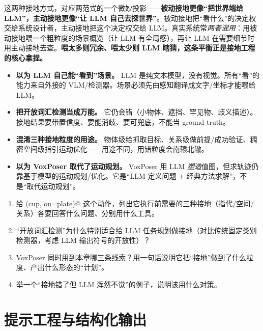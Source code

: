 \begin{insight}
这两种接地方式，对应两范式的一个微妙投影——\textbf{被动接地更像“把世界端给 LLM”，主动接地更像“让 LLM 自己去探世界”}。被动接地把“看什么”的决定权交给系统设计者，主动接地把这个决定权交给 LLM。真实系统常\emph{两者混用}：用被动接地喂一个粗粒度的场景概览（让 LLM 有全局感），再让 LLM 在需要细节时用主动接地去查。\textbf{喂太多则冗余、喂太少则 LLM 瞎猜，这条平衡正是接地工程的核心拿捏。}
\end{insight}

\begin{pitfall}[本节常见陷阱]
\begin{itemize}
  \item \textbf{以为 LLM 自己能“看到”场景。} LLM 是纯文本模型，没有视觉。所有“看”的能力来自外接的 VLM/检测器。场景必须先由感知翻译成文字/坐标才能喂给 LLM。
  \item \textbf{把开放词汇检测当成万能。} 它仍会错（小物体、遮挡、罕见物、歧义描述）。接地结果要带置信度、要能消歧、要可兜底，不能当 ground truth。
  \item \textbf{混淆三种接地粒度的用途。} 物体级给抓取目标、关系级做前提/成功验证、稠密空间级指引运动优化——用途不同，用错粒度会南辕北辙。
  \item \textbf{以为 VoxPoser 取代了运动规划。} VoxPoser 用 LLM \emph{塑造}值图，但求轨迹仍靠基于模型的运动规划/优化。它是“LLM 定义问题 $+$ 经典方法求解”，不是“取代运动规划”。
\end{itemize}
\end{pitfall}

\begin{exercise}
\begin{enumerate}
  \item 给 \verb@place(cup, on=plate)@ 这个动作，列出它执行前需要的三种接地（指代/空间/关系）各要回答什么问题、分别用什么工具。
  \item “开放词汇检测”为什么特别适合给 LLM 任务规划做接地（对比传统固定类别检测器，考虑 LLM 输出符号的开放性）？
  \item VoxPoser 同时用到本章哪三条线索？用一句话说明它把“接地”做到了什么粒度、产出什么形态的“计划”。
  \item 举一个“接地错了但 LLM 浑然不觉”的例子，说明该用什么对策。
\end{enumerate}
\end{exercise}

\section{提示工程与结构化输出}
\label{sec:prompt}

